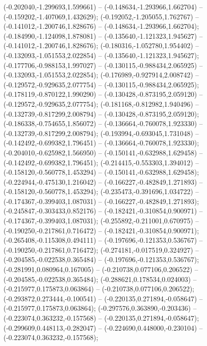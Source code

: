  (-0.202040,-1.299693,1.599661) -- (-0.148634,-1.293966,1.662704) -- (-0.159202,-1.407069,1.432629);
 (-0.192052,-1.205055,1.762767) -- (-0.141012,-1.200746,1.828676) -- (-0.148634,-1.293966,1.662704);
 (-0.184990,-1.124098,1.878081) -- (-0.135640,-1.121323,1.945627) -- (-0.141012,-1.200746,1.828676);
 (-0.180316,-1.052780,1.954402) -- (-0.132093,-1.051553,2.022854) -- (-0.135640,-1.121323,1.945627);
 (-0.177706,-0.988153,1.997027) -- (-0.130115,-0.988434,2.065925) -- (-0.132093,-1.051553,2.022854);
 (-0.176989,-0.927914,2.008742) -- (-0.129572,-0.929635,2.077754) -- (-0.130115,-0.988434,2.065925);
 (-0.178119,-0.870122,1.990290) -- (-0.130428,-0.873195,2.059120) -- (-0.129572,-0.929635,2.077754);
 (-0.181168,-0.812982,1.940496) -- (-0.132739,-0.817299,2.008794) -- (-0.130428,-0.873195,2.059120);
 (-0.186338,-0.754655,1.856072) -- (-0.136664,-0.760078,1.923330) -- (-0.132739,-0.817299,2.008794);
 (-0.193994,-0.693045,1.731048) -- (-0.142492,-0.699382,1.796451) -- (-0.136664,-0.760078,1.923330);
 (-0.204010,-0.625982,1.566950) -- (-0.150141,-0.632988,1.629458) -- (-0.142492,-0.699382,1.796451);
 (-0.214415,-0.553303,1.394012) -- (-0.158120,-0.560778,1.453294) -- (-0.150141,-0.632988,1.629458);
 (-0.224944,-0.475130,1.216042) -- (-0.166227,-0.482849,1.271893) -- (-0.158120,-0.560778,1.453294);
 (-0.235473,-0.391696,1.034722) -- (-0.174367,-0.399403,1.087031) -- (-0.166227,-0.482849,1.271893);
 (-0.245847,-0.303433,0.852176) -- (-0.182421,-0.310854,0.900971) -- (-0.174367,-0.399403,1.087031);
 (-0.255892,-0.211001,0.670975) -- (-0.190250,-0.217861,0.716472) -- (-0.182421,-0.310854,0.900971);
 (-0.265408,-0.115308,0.494111) -- (-0.197696,-0.121353,0.536767) -- (-0.190250,-0.217861,0.716472);
 (-0.274181,-0.017519,0.324927) -- (-0.204585,-0.022538,0.365484) -- (-0.197696,-0.121353,0.536767);
 (-0.281991,0.080964,0.167005) -- (-0.210738,0.077106,0.206522) -- (-0.204585,-0.022538,0.365484);
 (-0.288621,0.178534,0.024003) -- (-0.215977,0.175873,0.063864) -- (-0.210738,0.077106,0.206522);
 (-0.293872,0.273444,-0.100541) -- (-0.220135,0.271894,-0.058647) -- (-0.215977,0.175873,0.063864);
 (-0.297576,0.363890,-0.203436) -- (-0.223074,0.363232,-0.157568) -- (-0.220135,0.271894,-0.058647);
 (-0.299609,0.448113,-0.282047) -- (-0.224690,0.448000,-0.230104) -- (-0.223074,0.363232,-0.157568);
